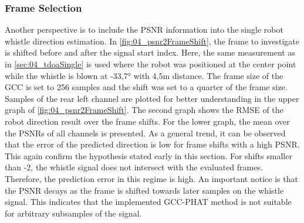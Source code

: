 \subsubsection*{Frame Selection}

Another perspective is to include the PSNR information into the single
robot whistle direction estimation.
In \cref{fig:04_psnr2FrameShift}, the frame to investigate is
shifted before and after the signal start index.
Here, the same measurement as in \cref{sec:04_tdoaSingle} is used where
the robot was positioned at the center point
while the whistle is blown at -33,7\si{\degree} with 4,5\si{\meter}
distance.
The frame size of the \ac{GCC} is set to 256 samples and the shift
was set to a quarter of the frame size.
Samples of the rear left channel are plotted for better understanding
in the upper graph of \cref{fig:04_psnr2FrameShift}.
The second graph shows the \ac{RMSE} of the robot direction result
over the frame shifts.
For the lower graph, the mean over the \acp{PSNR} of all channels
is presented.
As a general trend, it can be observed that the error of the predicted
direction is low for frame shifts with a high \ac{PSNR}. This again confirm the
hypothesis stated early in this section.
For shifts smaller than -2, the whistle signal does not intersect with the
evaluated frames. Therefore, the prediction error in this regime is high.
An important notice is that the \ac{PSNR} decays as the frame is shifted towards
later samples on the whistle signal. This indicates that the implemented
\ac{GCC-PHAT} method is not suitable for arbitrary subsamples of the signal.
